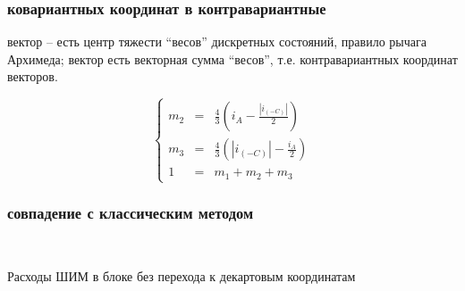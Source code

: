 \begin{frame}
\frametitle{ ковариантных координат в контравариантные}

\begin{itemize}
	 вектор -- есть центр тяжести \enquote{весов} дискретных состояний, правило рычага Архимеда;%
	 вектор есть векторная сумма \enquote{весов}, т.е. контравариантных координат векторов.
\end{itemize}
$$
        \left\{
        \begin{array}{lcl}
		m_2 &=& {\displaystyle \frac{4}{3}\left(i_{\scriptscriptstyle A} - \frac{|i_{\scriptscriptstyle(-C)}|}{2}\right)} \\
		m_3 &=& {\displaystyle \frac{4}{3}\left(|i_{\scriptscriptstyle (-C)}| - \frac{i_{\scriptscriptstyle A}}{2}\right)} \\
		1 &=& m_1 + m_2 + m_3 
        \end{array}
        \right.
$$
\end{frame}

\begin{frame}
\frametitle{\small совпадение с классическим методом}
\begin{figure}
\begin{center}
  \\
\end{center}
\end{figure}
	Расходы ШИМ в блоке без перехода к декартовым координатам \cite{source}
\end{frame}


